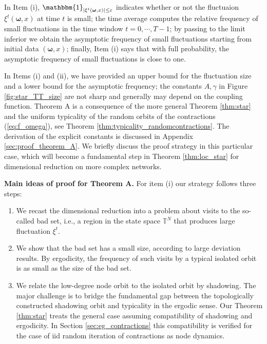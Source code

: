 \documentclass[a4paper]{article}
\theoremstyle{plain}
\theoremstyle{definition}
\newcommand{\T}{\mathbb{T}}
\newcommand{\One}{\mathbbm{1}}
\begin{document}
In Item (i),  $\One_{|\xi^t(\boldsymbol{\omega},x)| \leq \varepsilon} $ indicates whether or not the fluctuaion $\xi^t(\boldsymbol{\omega},x)$ at time $t$ is small; the time average computes the relative frequency of small fluctuations in the time window $t=0,\cdots,T-1$; by passing to the limit inferior we obtain the asymptotic frequency of small fluctuations starting from initial data $(\boldsymbol{\omega},x)$; finally, Item (i) says that with full probability, the asymptotic frequency of small fluctuations is close to one.


In Items (i) and (ii), we have provided an upper bound for the fluctuation size and a lower bound for the asymptotic frequency; the constants $A,\gamma$ in Figure \ref{fig:star_TT_size} are not sharp and generally may depend on the coupling function. 
Theorem A is a consequence of the more general Theorem \ref{thm:star} and the uniform typicality of the random orbits of the contractions (\ref{eq:f_omega}), see Theorem \ref{thm:typicality_randomcontractions}. The derivation of the explicit constants is discussed in Appendix \ref{sec:proof_theorem_A}. We briefly discuss the proof strategy in this particular case, which will become a fundamental step in Theorem  \ref{thm:loc_star} for dimensional reduction on more complex networks.

\textbf{Main ideas of proof for Theorem {A}.} For item (i) our strategy follows three steps:
\begin{enumerate}
	\item[1.] We recast the dimensional reduction into a problem about visits to the so-called bad set, i.e., a region in the state space $\T^N$ that produces large fluctuation $\xi^t$.  
	
	\item[2.] We show that the bad set has a small size, according to large deviation results. By ergodicity, the frequency of such visits by a typical isolated orbit is as small as the size of the bad set. 
	
	\item[3.] We relate the low-degree node orbit to the isolated orbit by shadowing. The major challenge is to bridge the fundamental gap between the topologically constructed shadowing orbit and typicality in the ergodic sense. Our Theorem \ref{thm:star} treats the general case assuming compatibility of shadowing and ergodicity. In Section \ref{sec:eg_contractions} this compatibility is verified for the case of iid random iteration of contractions as node dynamics.
\end{enumerate}
\end{document}
